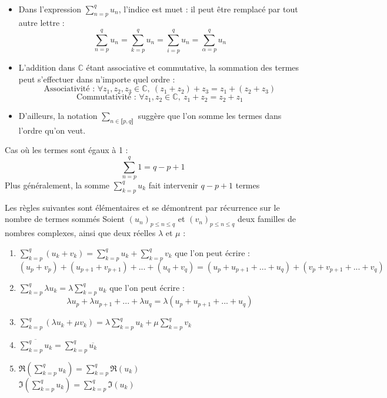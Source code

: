 \documentclass[a4paper,11pt]{article}
\newcommand{\C}{\mathbb{C}}
\newcommand{\intN}[2]{\llbracket #1, #2 \rrbracket}
\newcommand{\encadLEQ}[3]{#1 \leq #2 \leq #3}
\newcommand{\famille}[2]{(#1)_{#2}}
\begin{document}
\begin{remarque}
	\\
	\begin{itemize}
		\item Dans l'expression $\sum_{n=p}^{q}u_n$, l'indice est muet : il peut être remplacé par tout autre lettre :
		$$\sum_{n=p}^{q}u_n = \sum_{k=p}^{q}u_n = \sum_{i=p}^{q}u_n = \sum_{\alpha=p}^{q}u_n$$
		\item L'addition dans $\C$ étant associative et commutative, la sommation des termes peut s'effectuer dans n'importe quel ordre :
		$$\text{Associativité : }\forall z_1,z_2,z_3\in\C, \: (z_1 + z_2) + z_3 = z_1 + (z_2 + z_3)$$
		$$\text{Commutativité : } \forall z_1, z_2\in\C, \: z_1 + z_2 = z_2 + z_1$$
		\item D'ailleurs, la notation $\sum_{n\in\intN{p}{q}}$ suggère que l'on somme les termes dans l'ordre qu'on veut.
	\end{itemize}
\end{remarque}

\begin{exemples}
	Cas où les termes sont égaux à 1 :
	$$\sum_{n=p}^{q}1 = q - p + 1$$
	Plus généralement, la somme $\sum_{k=p}^{q}u_k$ fait intervenir $q - p + 1$ termes
\end{exemples}

\newpage

\begin{proposition}
	Les règles suivantes sont élémentaires et se démontrent par récurrence sur le nombre de termes sommés
	Soient $\famille{u_n}{\encadLEQ{p}{n}{q}}$ et $\famille{v_n}{\encadLEQ{p}{n}{q}}$ deux familles de nombres complexes, ainsi que deux réelles $\lambda$ et $\mu$ :
	\begin{enumerate}
		\item $\sum_{k=p}^{q}(u_k + v_k) = \sum_{k=p}^{q}u_k + \sum_{k=p}^{q}v_k$ que l'on peut écrire :
		$$(u_p + v_p) + (u_{p+1} + v_{p+1}) + ... + (u_q + v_q) = (u_p + u_{p+1} + ... + u_q) + (v_p + v_{p+1} + ... + v_q)$$
		\item $\sum_{k=p}^{q}\lambda u_k = \lambda \sum_{k=p}^{q}u_k$ que l'on peut écrire :
		$$\lambda u_p + \lambda u_{p+1} + ... + \lambda u_q = \lambda (u_p + u_{p+1} + ... + u_q)$$
		\item $\sum_{k=p}^{q}(\lambda u_k + \mu v_k) = \lambda\sum_{k=p}^{q}u_k + \mu\sum_{k=p}^{q}v_k$
		\item $\overline{\sum_{k=p}^{q}u_k} = \sum_{k=p}^{q}\overline{u_k}$
		\item $\Re(\sum_{k=p}^{q}u_k) = \sum_{k=p}^{q}\Re(u_k)$\\
		$\Im(\sum_{k=p}^{q}u_k) = \sum_{k=p}^{q}\Im(u_k)$
	\end{enumerate}
\end{proposition}
\end{document}
